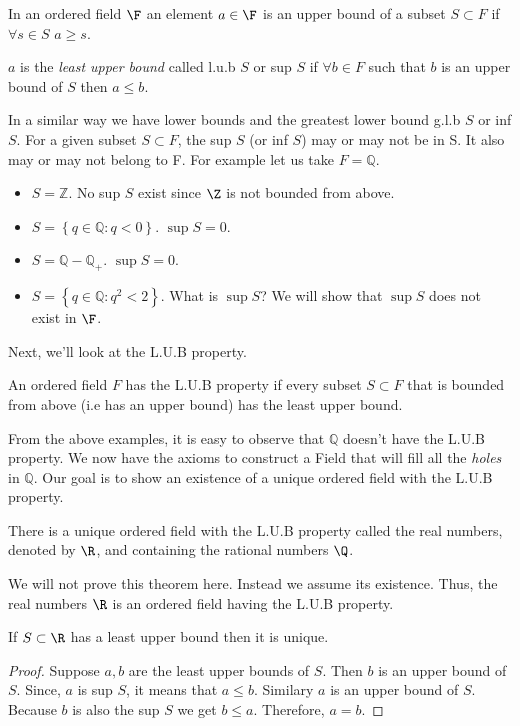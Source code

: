 \begin{Definition}
    In an ordered field $\F$ an element $a \in \F$ is an upper bound of a subset $S \subset F$ if
    $ \forall s \in S$ $ a \geq s$.
\end{Definition}
\begin{Definition}
    $a$ is the \textit{least upper bound} called l.u.b $S$ or sup $S$ if $\forall b \in F$ such that
    $b$ is an upper bound of $S$ then $ a \leq b$.  
\end{Definition}
In a similar way we have lower bounds and the greatest lower bound g.l.b $S$ or inf $S$. 
For a given subset $S \subset F$, the sup $S$ (or inf $S$) may or may not be in S. It 
also may or may not belong to F. For example let us take $ F = \mathbb{Q} $. 
\begin{itemize}
    \item $ S = \mathbb{Z} $. No sup $S$ exist since $\Z$ is not bounded from above.
    \item $ S = \left \lbrace q \in \mathbb{Q} : q < 0 \right \rbrace$. $\sup{S} = 0$.
    \item $ S = \mathbb{Q} - \mathbb{Q}_+ $. $\sup{S}  = 0$.
    \item $ S = \left \lbrace q \in \mathbb{Q} : q^2 < 2 \right \rbrace $. What is $\sup{S}$? We will 
	show that $\sup{S}$ does not exist in $\F$. 
\end{itemize}
Next, we'll look at the L.U.B property. 
\begin{Definition}
    An ordered field $F$ has the L.U.B property if every subset $ S \subset F$ that is bounded
    from above (i.e has an upper bound) has the least upper bound.  
\end{Definition}

From the above examples, it is easy to observe that $\mathbb{Q}$ doesn't have the L.U.B property.
We now have the axioms to construct a Field that will fill all the \textit{holes} in $\mathbb{Q}$.
Our goal is to show an existence of a unique ordered field with the L.U.B property. 
\begin{Theorem}[name=Existence of $\mathbb{R}$]
    There is a unique ordered field with the L.U.B property called the real numbers, denoted by $\R$, and
    containing the rational numbers $\Q$.
\end{Theorem} 
We will not prove this theorem here. Instead we assume its existence. Thus, the real numbers $\R$ is an
ordered field having the L.U.B property.

\begin{Corollary}
    If $S \subset \R$ has a least upper bound then it is unique. 
\end{Corollary}
\begin{proof}
    Suppose $a,b$ are the least upper bounds of $S$. Then $b$ is an upper bound of $S$.
    Since, $a$ is sup $S$, it means that $ a \leq b$. Similary $a$ is an upper bound of $S$.
    Because $b$ is also the sup $S$ we get $ b \leq a $. Therefore, $a = b$.
\end{proof}

